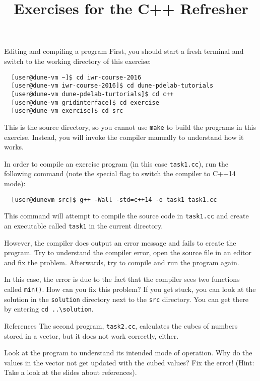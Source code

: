 \documentclass[12pt,a4paper]{article}
\title{\textbf{Exercises for the C++ Refresher}}
\begin{document}
\exerciseheader

\begin{Exercise}{Editing and compiling a program}
First, you should start a fresh terminal and switch to the working directory of this exercise:
\begin{lstlisting}
  [user@dune-vm ~]$ cd iwr-course-2016
  [user@dune-vm iwr-course-2016]$ cd dune-pdelab-tutorials
  [user@dune-vm dune-pdelab-turtorials]$ cd c++
  [user@dune-vm gridinterface]$ cd exercise
  [user@dune-vm exercise]$ cd src
\end{lstlisting}

This is the source directory, so you cannot use \lstinline!make! to build the programs in this exercise.
Instead, you will invoke the compiler manually to understand how it works.

In order to compile an exercise program (in this case \lstinline!task1.cc!), run the following command (note
the special flag to switch the compiler to C++14 mode):

\begin{lstlisting}
  [user@dunevm src]$ g++ -Wall -std=c++14 -o task1 task1.cc
\end{lstlisting}

This command will attempt to compile the source code in \lstinline!task1.cc! and create an executable called \lstinline!task1! in the current directory.

However, the compiler does output an error message and fails to create the program. Try to understand the compiler error, open the source file in an editor and fix the problem. Afterwards, try to compile and run the program again.

In this case, the error is due to the fact that the compiler sees two functions called \texttt{min()}. How
can you fix this problem? If you get stuck, you can look at the solution in the \lstinline!solution! directory next to the \lstinline!src! directory. You can get there by entering \lstinline!cd ..\solution!.

\end{Exercise}

\begin{Exercise}{References}
The second program, \lstinline!task2.cc!, calculates the cubes of numbers stored in a vector, but it does not
work correctly, either.

Look at the program to understand its intended mode of operation. Why do the values in the vector not get
updated with the cubed values? Fix the error! (Hint: Take a look at the slides about references).

\end{Exercise}
\end{document}
